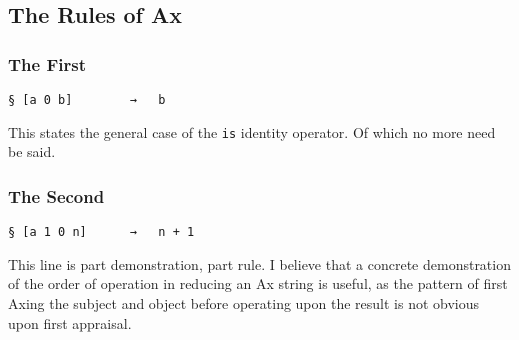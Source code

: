 \documentclass[twoside]{article}
\begin{document}




\subsection{The Rules of Ax}

\subsubsection{The First}

\begin{lstlisting}[style=listingcode]
§ [a 0 b]        →   b
\end{lstlisting}

\noindent
This states the general case of the \texttt{is} identity operator. Of which no more need be said.

\subsubsection{The Second}

\begin{lstlisting}[style=listingcode]
§ [a 1 0 n]      →   n + 1
\end{lstlisting}

\noindent
This line is part demonstration, part rule. I believe that a concrete demonstration of the order of operation in reducing an Ax string is useful, as the pattern of first Axing the subject and object before operating upon the result is not obvious upon first appraisal.
\end{document}
